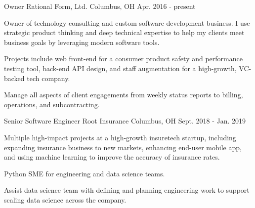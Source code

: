 

\begin{cventries}

  \cventry
    {Owner} %
    {Rational Form, Ltd.} %
    {Columbus, OH} %
    {Apr. 2016 - present} %
    {
      \begin{cvitems} %
        \item {Owner of technology consulting and custom software development business. I use strategic product thinking and deep technical expertise to help my clients meet business goals by leveraging modern software tools.}
        \item {Projects include web front-end for a consumer product safety and performance testing tool,
        back-end API design, and staff augmentation for a high-growth, VC-backed tech company.}
        \item {Manage all aspects of client engagements from weekly status reports to billing, operations,
        and subcontracting.}
      \end{cvitems}
    }

% 
%
  \cventry
    {Senior Software Engineer} %
    {Root Insurance} %
    {Columbus, OH} %
    {Sept. 2018 - Jan. 2019} %
    {
      \begin{cvitems} %
        \item {Multiple high-impact projects at a high-growth insuretech startup,
          including expanding insurance business to new markets,
          enhancing end-user mobile app,
          and using machine learning to improve the accuracy of insurance rates.}
        \item {Python SME for engineering and data science teams.}
        \item {Assist data science team with defining and planning engineering work to support scaling data science across the company.}
      \end{cvitems}
    }


\end{cventries}
